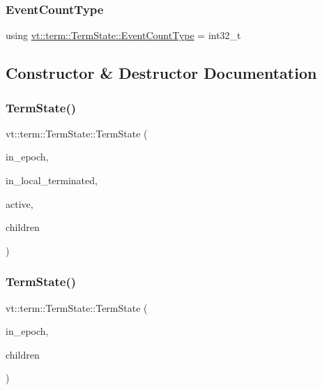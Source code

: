 \subsubsection{\texorpdfstring{Event\+Count\+Type}{EventCountType}}
{\footnotesize\ttfamily using \hyperlink{structvt_1_1term_1_1_term_state_a900fe4e9d98c81a320ae1dca27b71c2c}{vt\+::term\+::\+Term\+State\+::\+Event\+Count\+Type} =  int32\+\_\+t}



\subsection{Constructor \& Destructor Documentation}
\mbox{\label{structvt_1_1term_1_1_term_state_a6949c80d5206b322eb0034ad17aa0ad0}} 
\subsubsection{\texorpdfstring{Term\+State()}{TermState()}\hspace{0.1cm}{\footnotesize\ttfamily [1/4]}}
{\footnotesize\ttfamily vt\+::term\+::\+Term\+State\+::\+Term\+State (\begin{DoxyParamCaption}\item[{\hyperlink{namespacevt_a985a5adf291c34a3ca263b3378388236}{Epoch\+Type} const \&}]{in\+\_\+epoch,  }\item[{bool const}]{in\+\_\+local\+\_\+terminated,  }\item[{bool const}]{active,  }\item[{\hyperlink{namespacevt_a866da9d0efc19c0a1ce79e9e492f47e2}{Node\+Type} const \&}]{children }\end{DoxyParamCaption})}

\mbox{\label{structvt_1_1term_1_1_term_state_a07b3f0ad915aee5a30d526e6172f3f90}} 
\subsubsection{\texorpdfstring{Term\+State()}{TermState()}\hspace{0.1cm}{\footnotesize\ttfamily [2/4]}}
{\footnotesize\ttfamily vt\+::term\+::\+Term\+State\+::\+Term\+State (\begin{DoxyParamCaption}\item[{\hyperlink{namespacevt_a985a5adf291c34a3ca263b3378388236}{Epoch\+Type} const \&}]{in\+\_\+epoch,  }\item[{\hyperlink{namespacevt_a866da9d0efc19c0a1ce79e9e492f47e2}{Node\+Type} const \&}]{children }\end{DoxyParamCaption})}

